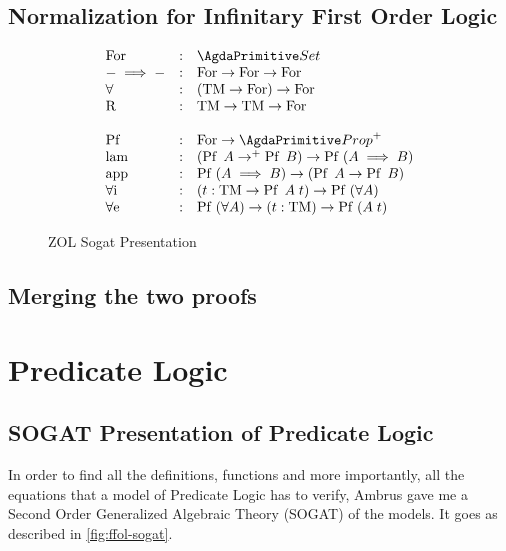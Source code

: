 \documentclass[10pt,a4paper]{article}
\begin{document}
		\subsection{Normalization for Infinitary First Order Logic}
		\begin{figure}
			\begin{tcolorbox}
				\[
				\begin{array}{lcl}
					\For & : & \Set \\
					- \implies - & : & \For \rightarrow \For \rightarrow \For\\
					\forall & : & (\operatorname{TM} \rightarrow \For) \rightarrow \For \\
					\R & : & \operatorname{TM} \rightarrow \operatorname{TM} \rightarrow \For\\
					\\
					\Pf & : & \For \rightarrow \Prop^+ \\
					\lam & : & (\Pf A \rightarrow^+ \Pf B) \rightarrow \Pf (A \implies B)\\
					\app & : & \Pf (A \implies B) \rightarrow (\Pf A \rightarrow \Pf B)\\
					\foralli & : & (t : \operatorname{TM} \rightarrow \Pf A\;t) \rightarrow \Pf (\forall A)\\
					\foralle & : & \Pf (\forall A) \rightarrow (t : \operatorname{TM}) \rightarrow \Pf (A\;t)\\
				\end{array}
				\]
			\end{tcolorbox}
			\caption{ZOL Sogat Presentation}
			\label{fig:ifol-sogat}
		\end{figure}
		\subsection{Merging the two proofs}
	\section{Predicate Logic}
		\subsection{SOGAT Presentation of Predicate Logic}
		
		In order to find all the definitions, functions and more importantly, all the equations that a model of Predicate Logic has to verify, Ambrus gave me a Second Order Generalized Algebraic Theory (SOGAT) of the models. It goes as described in \autoref{fig:ffol-sogat}.
		
\end{document}
